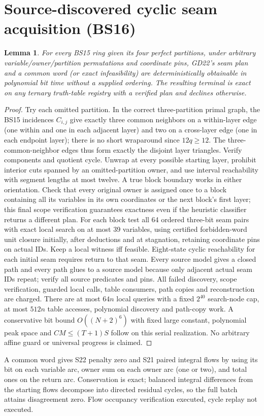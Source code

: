 \documentclass[11pt]{article}
\newtheorem{lemma}[theorem]{Lemma}
\begin{document}
\section{Source-discovered cyclic seam acquisition (BS16)}\label{sec:bs16}
\begin{lemma}\label{lem:bs16-discover}
For every BS15 ring given its four perfect partitions, under arbitrary variable/owner/partition permutations and coordinate pins, GD22's seam plan and a common word (or exact infeasibility) are deterministically obtainable in polynomial bit time without a supplied ordering. The resulting terminal is exact on any ternary truth-table registry with a verified plan and declines otherwise.
\end{lemma}
\begin{proof}
Try each omitted partition. In the correct three-partition primal graph, the BS15 incidences $C_{i,j}$ give exactly three common neighbors on a within-layer edge (one within and one in each adjacent layer) and two on a cross-layer edge (one in each endpoint layer); there is no short wraparound since $12q\ge12$. The three-common-neighbor edges thus form exactly the disjoint layer triangles. Verify components and quotient cycle. Unwrap at every possible starting layer, prohibit interior cuts spanned by an omitted-partition owner, and use interval reachability with segment lengths at most twelve. A true block boundary works in either orientation. Check that every original owner is assigned once to a block containing all its variables in its own coordinates or the next block's first layer; this final scope verification guarantees exactness even if the heuristic classifier returns a different plan.
For each block test all 64 ordered three-bit seam pairs with exact local search on at most 39 variables, using certified forbidden-word unit closure initially, after deductions and at stagnation, retaining coordinate pins on actual IDs. Keep a local witness iff feasible. Eight-state cyclic reachability for each initial seam requires return to that seam. Every source model gives a closed path and every path glues to a source model because only adjacent actual seam IDs repeat; verify all source predicates and pins. All failed discovery, scope verification, guarded local calls, table consumers, path copies and reconstruction are charged. There are at most $64n$ local queries with a fixed $2^{40}$ search-node cap, at most $512n$ table accesses, polynomial discovery and path-copy work. A conservative bit bound $O((N+2)^6)$ with fixed large constant, polynomial peak space and $CM\le(T+1)S$ follow on this serial realization. No arbitrary affine guard or universal progress is claimed.
\end{proof}
A common word gives S22 penalty zero and S21 paired integral flows by using its bit on each variable arc, owner sum on each owner arc (one or two), and total ones on the return arc. Conservation is exact; balanced integral differences from the starting flows decompose into directed residual cycles, so the full batch attains disagreement zero. Flow occupancy verification executed, cycle replay not executed.
 
\end{document}
